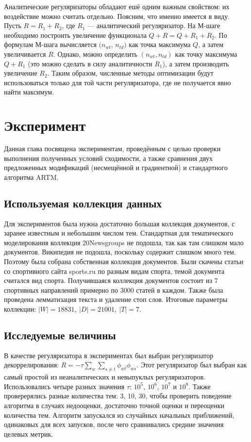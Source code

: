 \documentclass[12pt, twoside]{article}
\begin{document}
Аналитические регуляризаторы  обладают ешё одним важным свойством: их воздействие можно считать отдельно. Поясним, что именно имеется в виду. Пусть $R = R_1 + R_2$, где $R_1$ --- аналитический регуляризатор. На М-шаге необходимо построить увеличение функционала $Q + R = Q +  R_1 +  R_2$. По формулам М-шага вычисляется $(n_{wt}$, $n_{td})$ как точка максимума $Q$, а затем увеличивается $R$.  Однако, можно определить $(n_{wt},n_{td})$ как точку максимума $Q + R_1 $ (это можно сделать в силу аналитичности $R_1$), а затем производить увеличение $R_2$. Таким образом,  численные методы оптимизации будут использоваться только для той части регуляризатора, где не получается явно найти максимум.

	\section{Эксперимент}
Данная глава посвящена экспериментам, проведённым с целью проверки выполнения полученных условий сходимости, а также сравнения двух предложенных модификаций (несмещённой и градиентной) и стандартного алгоритма ARTM. 
\subsection{Используемая коллекция данных}
Для экспериментов была нужна достаточно большая коллекция документов, с заранее известным  и небольшим числом тем. Стандартная для тематического моделирования  коллекция 20Newsgroups не подошла, так как там слишком мало документов. Википедия не подошла, поскольку содержит слишком много тем. Поэтому была собрана собственная коллекция документов. Были скачены статьи со спортивного сайта sports.ru по разным видам спорта, темой документа считался вид спорта. Получившаяся коллекция документов состоит из 7 спортивных направлений примерно по 3000 статей в каждом. Также была проведена лемматизация текста и удаление стоп слов. Итоговые параметры коллекции: $|W| = 18831,~|D| = 21001,~|T| = 7$.
\subsection{Исследуемые величины}
В качестве регуляризатора в экспериментах был выбран регуляризатор декоррелирования: $R = - \tau \sum_w \sum_{s \neq t} \phi_{wt} \phi_{ws}$. Этот регуляризатор был выбран как самый простой из неаналитических и невыпуклых регуляризаторов. Использовались четыре разных значения $\tau$: $10^5$, $10^6$, $10^7$ и $10^8$. Также проверерялись разные количества тем: 3, 10, 30, чтобы проверить поведение алгоритма в случаях недооценки, достаточно точной оценки и переоценки  количества тем. Алгоритм  запускался из случайных начальных приближений, одинаковых для всех запусков, после чего сравнивались средние значения целевых метрик.
\end{document}
